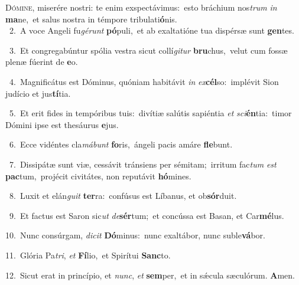 \lettrine{\initial\textcolor{\initialcolor}{D}}{ómine,} miserére nostri: te enim exspectávimus:~\dagger esto bráchium nos\textit{trum} \textit{in} \textbf{ma}\-ne,~\star et salus nostra in témpore tribulati\-\textbf{ó}\-nis.\\
{\numbfont\textcolor{\numbcolor}{~2.}}~A voce Angeli fu\-\textit{gé}\-\textit{runt} \textbf{pó}\-puli,~\star et ab exaltatióne tua dispérsæ sunt \textbf{gen}\-tes.\par
{\numbfont\textcolor{\numbcolor}{~3.}}~Et congregabúntur spólia vestra sicut collí\-\textit{gi}\-\textit{tur} \textbf{bru}\-chus,~\star velut cum fossæ plenæ fúerint de \textbf{e}\-o.\par
{\numbfont\textcolor{\numbcolor}{~4.}}~Magnificátus est Dóminus, quóniam habitávit \textit{in} \textit{ex}\-\textbf{cél}so:~\star implévit Sion judício et jus\-\textbf{tí}\-tia.\par
{\numbfont\textcolor{\numbcolor}{~5.}}~Et erit fides in tempóribus tuis:~\dagger divítiæ salútis sapiéntia \textit{et} \textit{sci}\-\textbf{én}tia:~\star timor Dómini ipse est thesáurus \textbf{e}\-jus.\par
{\numbfont\textcolor{\numbcolor}{~6.}}~Ecce vidéntes cla\-\textit{má}\-\textit{bunt} \textbf{fo}\-ris,~\star ángeli pacis amáre \textbf{fle}\-bunt.\par
{\numbfont\textcolor{\numbcolor}{~7.}}~Dissipátæ sunt viæ, cessávit tránsiens per sémitam;~\dagger irritum fac\textit{tum} \textit{est} \textbf{pac}\-tum,~\star projécit civitátes, non reputávit \textbf{hó}\-mines.\par
{\numbfont\textcolor{\numbcolor}{~8.}}~Luxit et elán\-\textit{gu}\-\textit{it} \textbf{ter}\-ra:~\star confúsus est Líbanus, et ob\-\textbf{sór}\-duit.\par
{\numbfont\textcolor{\numbcolor}{~9.}}~Et factus est Saron sic\textit{ut} \textit{de}\-\textbf{sér}tum;~\star et concússa est Basan, et Car\-\textbf{mé}\-lus.\par
{\numbfont\textcolor{\numbcolor}{10.}}~Nunc consúrgam, \textit{di}\-\textit{cit} \textbf{Dó}\-minus:~\star nunc exaltábor, nunc suble\-\textbf{vá}\-bor.\par
{\numbfont\textcolor{\numbcolor}{11.}}~Glória Pa\-\textit{tri}\-, \textit{et} \textbf{Fí}\-lio,~\star et Spirítui \textbf{Sanc}\-to.\par
{\numbfont\textcolor{\numbcolor}{12.}}~Sicut erat in princípio, et \textit{nunc}\-, \textit{et} \textbf{sem}\-per,~\star et in sǽcula sæculórum. \textbf{A}\-men.\par
